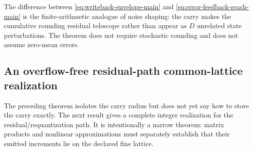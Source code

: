 \documentclass[twoside,11pt]{article}
\begin{document}
The difference between \eqref{eq:writeback-envelope-main} and \eqref{eq:error-feedback-reach-main} is the finite-arithmetic analogue of noise shaping: the carry makes the cumulative rounding residual telescope rather than appear as $D$ unrelated state perturbations.  The theorem does not require stochastic rounding and does not assume zero-mean errors.

\subsection{An overflow-free residual-path common-lattice realization}
\label{sec:common-lattice-main}

The preceding theorem isolates the carry radius but does not yet say how to
store the carry exactly.  The next result gives a complete integer
realization for the residual/requantization path.  It is intentionally a
narrow theorem: matrix products and nonlinear approximations must separately
establish that their emitted increments lie on the declared fine lattice.
\end{document}
